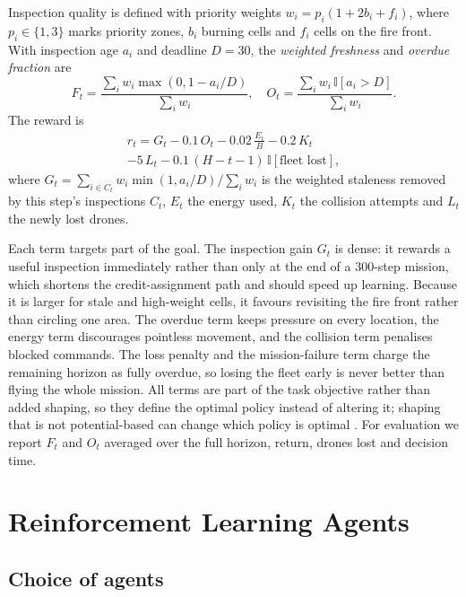 Inspection quality is defined with priority weights $w_i = p_i(1 + 2b_i + f_i)$, where
$p_i \in \{1, 3\}$ marks priority zones, $b_i$ burning cells and $f_i$ cells on the fire
front. With inspection age $a_i$ and deadline $D = 30$, the \emph{weighted freshness} and
\emph{overdue fraction} are
\begin{equation}
F_t = \frac{\sum_i w_i \max(0, 1 - a_i/D)}{\sum_i w_i}, \quad
O_t = \frac{\sum_i w_i \, \mathbb{I}[a_i > D]}{\sum_i w_i}.
\end{equation}
The reward is
\begin{multline}
r_t = G_t - 0.1\,O_t - 0.02\,\frac{E_t}{B} - 0.2\,K_t \\
- 5\,L_t - 0.1\,(H - t - 1)\,\mathbb{I}[\text{fleet lost}],
\label{eq:reward}
\end{multline}
where $G_t = \sum_{i \in C_t} w_i \min(1, a_i/D) / \sum_i w_i$ is the weighted staleness
removed by this step's inspections $C_t$, $E_t$ the energy used, $K_t$ the collision
attempts and $L_t$ the newly lost drones.

Each term targets part of the goal. The inspection gain $G_t$ is dense: it rewards a useful
inspection immediately rather than only at the end of a 300-step mission, which shortens the
credit-assignment path and should speed up learning. Because it is larger for stale and
high-weight cells, it favours revisiting the fire front rather than circling one area. The
overdue term keeps pressure on every location, the energy term discourages pointless
movement, and the collision term penalises blocked commands. The loss penalty and the
mission-failure term charge the remaining horizon as fully overdue, so losing the fleet early
is never better than flying the whole mission. All terms are part of the task objective
rather than added shaping, so they define the optimal policy instead of altering it; shaping
that is not potential-based can change which policy is optimal \cite{ng1999}. For evaluation
we report $F_t$ and $O_t$ averaged over the full horizon, return, drones lost and
decision time.

\section{Reinforcement Learning Agents}

\subsection{Choice of agents}

